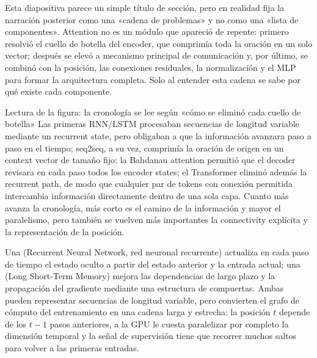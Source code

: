 Esta diapositiva parece un simple título de sección, pero en realidad fija la narración posterior como una «cadena de problemas» y no como una «lista de componentes». Attention no es un módulo que apareció de repente: primero resolvió el cuello de botella del encoder, que comprimía toda la oración en un solo vector; después se elevó a mecanismo principal de comunicación y, por último, se combinó con la posición, las conexiones residuales, la normalización y el MLP para formar la arquitectura completa. Solo al entender esta cadena se sabe por qué existe cada componente.


\begin{knowledgebox}{Lectura de la figura: la cronología se lee según «cómo se eliminó cada cuello de botella»}
Las primeras RNN/LSTM procesaban secuencias de longitud variable mediante un recurrent state, pero obligaban a que la información avanzara paso a paso en el tiempo; seq2seq, a su vez, comprimía la oración de origen en un context vector de tamaño fijo; la Bahdanau attention permitió que el decoder revisara en cada paso todos los encoder states; el Transformer eliminó además la recurrent path, de modo que cualquier par de tokens con conexión permitida intercambia información directamente dentro de una sola capa. Cuanto más avanza la cronología, más corto es el camino de la información y mayor el paralelismo, pero también se vuelven más importantes la connectivity explícita y la representación de la posición.
\end{knowledgebox}


Una  (Recurrent Neural Network, red neuronal recurrente) actualiza en cada paso de tiempo el estado oculto a partir del estado anterior y la entrada actual; una  (Long Short-Term Memory) mejora las dependencias de largo plazo y la propagación del gradiente mediante una estructura de compuertas. Ambas pueden representar secuencias de longitud variable, pero convierten el grafo de cómputo del entrenamiento en una cadena larga y estrecha: la posición $t$ depende de los $t-1$ pasos anteriores, a la GPU le cuesta paralelizar por completo la dimensión temporal y la señal de supervisión tiene que recorrer muchos saltos para volver a las primeras entradas.

